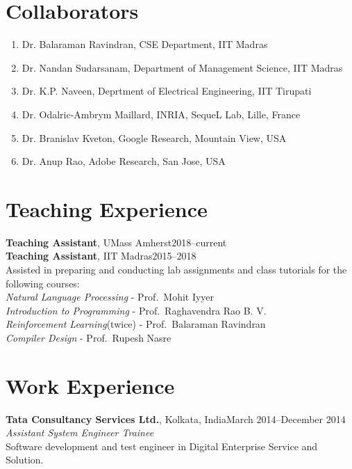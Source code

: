 \documentclass[margin,11pt]{res}
\begin{document}
\begin{resume}

\section{Collaborators}
\begin{enumerate}
\item Dr. Balaraman Ravindran, CSE Department, IIT Madras
\item Dr. Nandan Sudarsanam, Department of Management Science, IIT Madras
\item Dr. K.P. Naveen, Deprtment of Electrical Engineering, IIT Tirupati
\item Dr. Odalric-Ambrym Maillard, INRIA, SequeL Lab, Lille, France
\item Dr. Branislav Kveton, Google Research, Mountain View, USA
\item Dr. Anup Rao, Adobe Research, San Jose, USA
\end{enumerate}

\section{Teaching Experience}
\par
\textbf{Teaching Assistant}, UMass Amherst\hfill 2018--current\\
\textbf{Teaching Assistant}, IIT Madras\hfill 2015--2018\\
Assisted in preparing and conducting lab assignments and class tutorials for the following courses:\\
\textit{Natural Language Processing} - Prof.~Mohit Iyyer\\
\textit{Introduction to Programming} - Prof.~Raghavendra Rao B. V. \\
\textit{Reinforcement Learning}(twice) - Prof.~Balaraman Ravindran\\
\textit{Compiler Design} - Prof.~Rupesh Nasre

\section{Work Experience}
\textbf{Tata Consultancy Services Ltd.}, Kolkata, India\hfill March 2014--December 2014\\
\textit{Assistant System Engineer Trainee}\\
Software development and test engineer in Digital Enterprise Service and Solution.


\end{resume}
\end{document}
